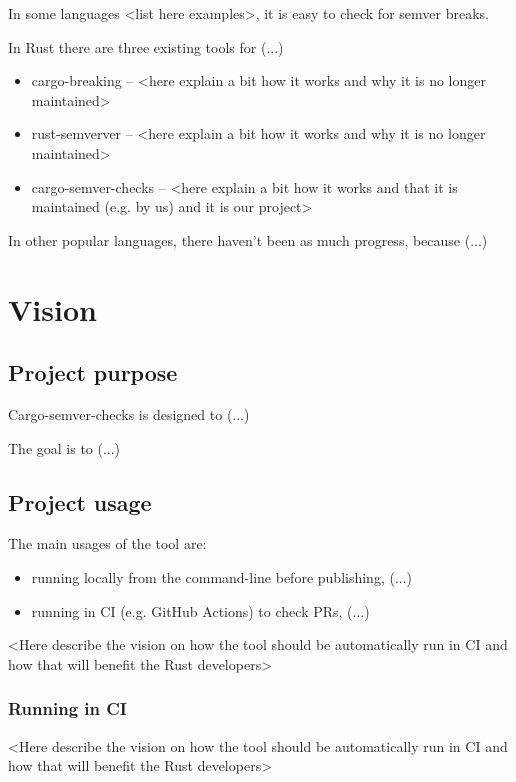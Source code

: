 \documentclass[licencjacka,en]{pracamgr}
\begin{document}
In some languages <list here examples>, it is easy to check for semver breaks.

In Rust there are three existing tools for (...)
\begin{itemize}
	\item cargo-breaking -- <here explain a bit how it works and why it is no longer maintained>
	\item rust-semverver -- <here explain a bit how it works and why it is no longer maintained>
	\item cargo-semver-checks -- <here explain a bit how it works and that it is maintained (e.g. by us) and it is our project>
\end{itemize}

In other popular languages, there haven't been as much progress, because (...)



\chapter{Vision}\label{r:vision}

\section{Project purpose}

Cargo-semver-checks is designed to (...)

The goal is to (...)


\section{Project usage}

The main usages of the tool are:
\begin{itemize}
	\item running locally from the command-line before publishing, (...)
	\item running in CI (e.g. GitHub Actions) to check PRs, (...)
\end{itemize}

<Here describe the vision on how the tool should be automatically run in CI
and how that will benefit the Rust developers>

\subsection{Running in CI}

<Here describe the vision on how the tool should be automatically run in CI
and how that will benefit the Rust developers>
\end{document}
